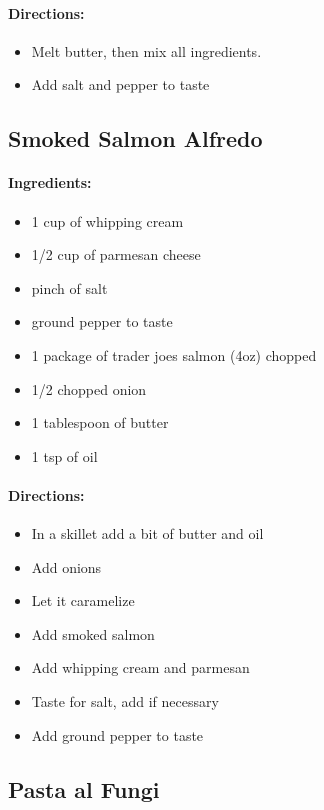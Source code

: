 \documentclass{article}
\begin{document}
\paragraph{Directions:}
\begin{itemize}
    \item Melt butter, then mix all ingredients.
    \item Add salt and pepper to taste
\end{itemize}

\subsection{Smoked Salmon Alfredo}

\paragraph{Ingredients:}
\begin{itemize}
    \item 1 cup of whipping cream
    \item 1/2 cup of parmesan cheese
    \item pinch of salt
    \item ground pepper to taste
    \item 1 package of trader joes salmon (4oz) chopped
    \item 1/2 chopped onion
    \item 1 tablespoon of butter
    \item 1 tsp of oil
\end{itemize}

\paragraph{Directions:}
\begin{itemize}
    \item In a skillet add a bit of butter and oil
    \item Add onions
    \item Let it caramelize
    \item Add smoked salmon
    \item Add whipping cream and parmesan
    \item Taste for salt, add if necessary
    \item Add ground pepper to taste
\end{itemize}

\subsection{Pasta al Fungi}
\end{document}
